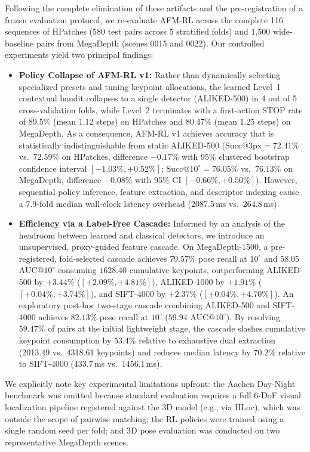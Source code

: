 \documentclass[conference]{IEEEtran}
\begin{document}
Following the complete elimination of these artifacts and the pre-registration of a frozen evaluation protocol, we re-evaluate AFM-RL across the complete 116 sequences of HPatches (580 test pairs across 5 stratified folds) and 1,500 wide-baseline pairs from MegaDepth (scenes 0015 and 0022). Our controlled experiments yield two principal findings:
\begin{itemize}
    \item \textbf{Policy Collapse of AFM-RL v1:} Rather than dynamically selecting specialized presets and tuning keypoint allocations, the learned Level~1 contextual bandit collapses to a single detector (ALIKED-500) in 4 out of 5 cross-validation folds, while Level~2 terminates with a first-action STOP rate of 89.5\% (mean 1.12 steps) on HPatches and 80.47\% (mean 1.25 steps) on MegaDepth. As a consequence, AFM-RL v1 achieves accuracy that is statistically indistinguishable from static ALIKED-500 ($\text{Succ}@3\text{px} = 72.41\%$ vs.\ $72.59\%$ on HPatches, difference $-0.17\%$ with 95\% clustered bootstrap confidence interval $[-1.03\%, +0.52\%]$; $\text{Succ}@10^\circ = 76.05\%$ vs.\ $76.13\%$ on MegaDepth, difference $-0.08\%$ with 95\% CI $[-0.66\%, +0.50\%]$). However, sequential policy inference, feature extraction, and descriptor indexing cause a 7.9-fold median wall-clock latency overhead (2087.5\,ms vs.\ 264.8\,ms).
    \item \textbf{Efficiency via a Label-Free Cascade:} Informed by an analysis of the headroom between learned and classical detectors, we introduce an unsupervised, proxy-guided feature cascade. On MegaDepth-1500, a pre-registered, fold-selected cascade achieves $79.57\%$ pose recall at $10^\circ$ and $58.05$ AUC@$10^\circ$ consuming $1628.40$ cumulative keypoints, outperforming ALIKED-500 by $+3.44\%$ ($[+2.09\%, +4.81\%]$), ALIKED-1000 by $+1.91\%$ ($[+0.04\%, +3.74\%]$), and SIFT-4000 by $+2.37\%$ ($[+0.04\%, +4.70\%]$). An exploratory post-hoc two-stage cascade combining ALIKED-500 and SIFT-4000 achieves $82.13\%$ pose recall at $10^\circ$ ($59.94$ AUC@$10^\circ$). By resolving $59.47\%$ of pairs at the initial lightweight stage, the cascade slashes cumulative keypoint consumption by $53.4\%$ relative to exhaustive dual extraction (2013.49 vs.\ 4318.61 keypoints) and reduces median latency by $70.2\%$ relative to SIFT-4000 (433.7\,ms vs.\ 1456.1\,ms).
\end{itemize}

We explicitly note key experimental limitations upfront: the Aachen Day-Night benchmark was omitted because standard evaluation requires a full 6-DoF visual localization pipeline registered against the 3D model (e.g., via HLoc), which was outside the scope of pairwise matching; the RL policies were trained using a single random seed per fold; and 3D pose evaluation was conducted on two representative MegaDepth scenes.
\end{document}
